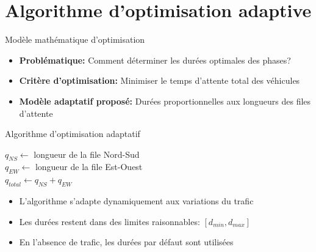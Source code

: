 \section{Algorithme d'optimisation adaptive}

\begin{frame}{Modèle mathématique d'optimisation}
  \begin{itemize}
    \item<1-> \textbf{Problématique:} Comment déterminer les durées optimales des phases?
    \item<2-> \textbf{Critère d'optimisation:} Minimiser le temps d'attente total des véhicules
    \item<3-> \textbf{Modèle adaptatif proposé:} Durées proportionnelles aux longueurs des files d'attente
  \end{itemize}
  
\end{frame}

\begin{frame}{Algorithme d'optimisation adaptatif}
  \begin{algorithm}[H]
  \caption{Optimisation adaptative des durées de phases}
  $q_{NS} \gets$ longueur de la file Nord-Sud\\
  $q_{EW} \gets$ longueur de la file Est-Ouest\\
  $q_{total} \gets q_{NS} + q_{EW}$\\
  \end{algorithm}
  
  \begin{itemize}
    \item<2-> L'algorithme s'adapte dynamiquement aux variations du trafic
    \item<3-> Les durées restent dans des limites raisonnables: $[d_{min}, d_{max}]$
    \item<4-> En l'absence de trafic, les durées par défaut sont utilisées
  \end{itemize}
\end{frame}

